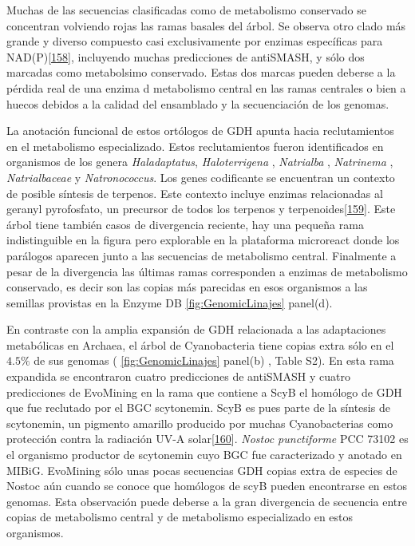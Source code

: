 \documentclass[12pt,twoside]{reedthesis}
\begin{document}
  Muchas de las secuencias clasificadas como de metabolismo conservado se
  concentran volviendo rojas las ramas basales del árbol. Se observa otro
  clado más grande y diverso compuesto casi exclusivamente por enzimas
  específicas para
  NAD(P){[}\protect\hyperlink{ref-ferrer_nadp-glutamate_1996}{158}{]},
  incluyendo muchas predicciones de antiSMASH, y sólo dos marcadas como
  metabolsimo conservado. Estas dos marcas pueden deberse a la pérdida
  real de una enzima d metabolismo central en las ramas centrales o bien a
  huecos debidos a la calidad del ensamblado y la secuenciación de los
  genomas.
  
  La anotación funcional de estos ortólogos de GDH apunta hacia
  reclutamientos en el metabolismo especializado. Estos reclutamientos
  fueron identificados en organismos de los genera \emph{Haladaptatus},
  \emph{Haloterrigena} , \emph{Natrialba} , \emph{Natrinema} ,
  \emph{Natrialbaceae} y \emph{Natronococcus}. Los genes codificante se
  encuentran un contexto de posible síntesis de terpenos. Este contexto
  incluye enzimas relacionadas al geranyl pyrofosfato, un precursor de
  todos los terpenos y
  terpenoides{[}\protect\hyperlink{ref-tholl_terpene_2006}{159}{]}. Este
  árbol tiene también casos de divergencia reciente, hay una pequeña rama
  indistinguible en la figura pero explorable en la plataforma microreact
  donde los parálogos aparecen junto a las secuencias de metabolismo
  central. Finalmente a pesar de la divergencia las últimas ramas
  corresponden a enzimas de metabolismo conservado, es decir son las
  copias más parecidas en esos organismos a las semillas provistas en la
  Enzyme DB \autoref{fig:GenomicLinajes} panel(d).
  
  En contraste con la amplia expansión de GDH relacionada a las
  adaptaciones metabólicas en Archaea, el árbol de Cyanobacteria tiene
  copias extra sólo en el \(4.5\%\) de sus genomas (
  \autoref{fig:GenomicLinajes} panel(b) , Table S2). En esta rama
  expandida se encontraron cuatro predicciones de antiSMASH y cuatro
  predicciones de EvoMining en la rama que contiene a ScyB el homólogo de
  GDH que fue reclutado por el BGC scytonemin. ScyB es pues parte de la
  síntesis de scytonemin, un pigmento amarillo producido por muchas
  Cyanobacterias como protección contra la radiación UV-A
  solar{[}\protect\hyperlink{ref-balskus_genetic_2010}{160}{]}.
  \emph{Nostoc punctiforme} PCC 73102 es el organismo productor de
  scytonemin cuyo BGC fue caracterizado y anotado en MIBiG. EvoMining sólo
  unas pocas secuencias GDH copias extra de especies de Nostoc aún cuando
  se conoce que homólogos de scyB pueden encontrarse en estos genomas.
  Esta observación puede deberse a la gran divergencia de secuencia entre
  copias de metabolismo central y de metabolismo especializado en estos
  organismos.
  
\end{document}
